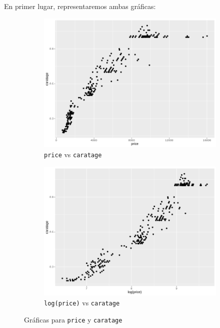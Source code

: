 \documentclass[a4paper, 9pt]{article}
\begin{document}
En primer lugar, representaremos ambas gráficas:

\begin{figure}[h!]
  \centering
  \begin{subfigure}[b]{0.4\linewidth}
    \includegraphics[width=\linewidth]{report/images/question-1/price.png}
    \caption{\texttt{price} vs \texttt{caratage}}
  \end{subfigure}
  \begin{subfigure}[b]{0.4\linewidth}
    \includegraphics[width=\linewidth]{report/images/question-1/log(price).png}
    \caption{\texttt{log(price)} vs \texttt{caratage}}
  \end{subfigure}
  \caption{Gráficas para \texttt{price} y \texttt{caratage}}
  \label{fig:coffee}
\end{figure}
\end{document}
